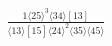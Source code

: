 \documentclass[varwidth, border=5pt]{standalone}
\begin{document}
\begin{my}
$\begin{gathered}
\scriptscriptstyle\frac{1⟨25⟩^3⟨34⟩[13]}{⟨13⟩[15]⟨24⟩^2⟨35⟩⟨45⟩}
\end{gathered}$
\end{my}
\end{document}

